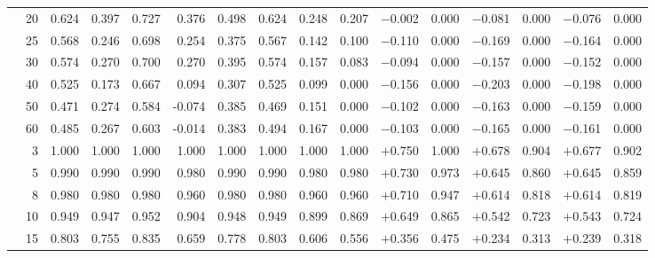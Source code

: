 \documentclass[conference]{IEEEtran}
\theoremstyle{remark}
\begin{document}
\begin{table}[t]
{\begin{tabular}{p{2.2cm}r rrrr rr rr rr rr rr}
  & 20 & 0.624 & 0.397 & 0.727 & 0.376 & 0.498 & 0.624 & 0.248 & 0.207 & $-$0.002 & 0.000 & $-$0.081 & 0.000 & $-$0.076 & 0.000 \\
  & 25 & 0.568 & 0.246 & 0.698 & 0.254 & 0.375 & 0.567 & 0.142 & 0.100 & $-$0.110 & 0.000 & $-$0.169 & 0.000 & $-$0.164 & 0.000 \\
  & 30 & 0.574 & 0.270 & 0.700 & 0.270 & 0.395 & 0.574 & 0.157 & 0.083 & $-$0.094 & 0.000 & $-$0.157 & 0.000 & $-$0.152 & 0.000 \\
  & 40 & 0.525 & 0.173 & 0.667 & 0.094 & 0.307 & 0.525 & 0.099 & 0.000 & $-$0.156 & 0.000 & $-$0.203 & 0.000 & $-$0.198 & 0.000 \\
  & 50 & 0.471 & 0.274 & 0.584 & -0.074 & 0.385 & 0.469 & 0.151 & 0.000 & $-$0.102 & 0.000 & $-$0.163 & 0.000 & $-$0.159 & 0.000 \\
  & 60 & 0.485 & 0.267 & 0.603 & -0.014 & 0.383 & 0.494 & 0.167 & 0.000 & $-$0.103 & 0.000 & $-$0.165 & 0.000 & $-$0.161 & 0.000 \\
\midrule
{}
  & 3  & 1.000 & 1.000 & 1.000 & 1.000 & 1.000 & 1.000 & 1.000 & 1.000 & $+$0.750 & 1.000 & $+$0.678 & 0.904 & $+$0.677 & 0.902 \\
  & 5  & 0.990 & 0.990 & 0.990 & 0.980 & 0.990 & 0.990 & 0.980 & 0.980 & $+$0.730 & 0.973 & $+$0.645 & 0.860 & $+$0.645 & 0.859 \\
  & 8  & 0.980 & 0.980 & 0.980 & 0.960 & 0.980 & 0.980 & 0.960 & 0.960 & $+$0.710 & 0.947 & $+$0.614 & 0.818 & $+$0.614 & 0.819 \\
  & 10 & 0.949 & 0.947 & 0.952 & 0.904 & 0.948 & 0.949 & 0.899 & 0.869 & $+$0.649 & 0.865 & $+$0.542 & 0.723 & $+$0.543 & 0.724 \\
  & 15 & 0.803 & 0.755 & 0.835 & 0.659 & 0.778 & 0.803 & 0.606 & 0.556 & $+$0.356 & 0.475 & $+$0.234 & 0.313 & $+$0.239 & 0.318 \\

\end{tabular}}
\end{table}
\end{document}
